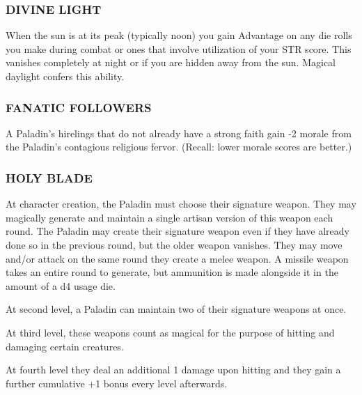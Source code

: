 \documentclass[twoside]{article}
\begin{document}
\subsubsection*{\footnotesize{D}\scriptsize{IVINE} \footnotesize{L}\scriptsize{IGHT}\normalsize}

When the sun is at its peak (typically noon) you gain Advantage on any die rolls you make during combat or ones that involve utilization of your STR score. This vanishes completely at night or if you are hidden away from the sun. Magical daylight confers this ability.

\subsubsection*{\footnotesize{F}\scriptsize{ANATIC} \footnotesize{F}\scriptsize{OLLOWERS}\normalsize}

A Paladin's hirelings that do not already have a strong faith gain -2 morale from the Paladin's contagious religious fervor. (Recall: lower morale scores are better.)

\subsubsection*{\footnotesize{H}\scriptsize{OLY} \footnotesize{B}\scriptsize{LADE}\normalsize}

At character creation, the Paladin must choose their signature weapon. They may magically generate and maintain a single artisan version of this weapon each round. The Paladin may create their signature weapon even if they have already done so in the previous round, but the older weapon vanishes. They may move and/or attack on the same round they create a melee weapon. A missile weapon takes an entire round to generate, but ammunition is made alongside it in the amount of a d4 usage die. 

\bigbreak

At second level, a Paladin can maintain two of their signature weapons at once. 

\bigbreak

At third level, these weapons count as magical for the purpose of hitting and damaging certain creatures. 

\bigbreak

At fourth level they deal an additional 1 damage upon hitting and they gain a further cumulative +1 bonus every level afterwards.
\end{document}
